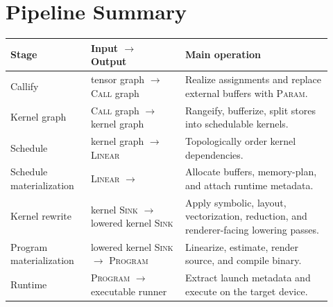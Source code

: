 \documentclass[10pt,letterpaper]{article}
\newcommand{\op}[1]{\textsc{#1}}
\newcommand{\code}[1]{\texttt{\detokenize{#1}}}
\begin{document}
\section*{Pipeline Summary}

\begin{tabular}{@{}p{0.23\linewidth} p{0.27\linewidth} p{0.42\linewidth}@{}}
\toprule
\textbf{Stage} & \textbf{Input $\rightarrow$ Output} & \textbf{Main operation} \\
\midrule
Callify & tensor graph $\rightarrow$ \op{Call} graph & Realize assignments and replace external buffers with \op{Param}. \\
Kernel graph & \op{Call} graph $\rightarrow$ kernel graph & Rangeify, bufferize, split stores into schedulable kernels. \\
Schedule & kernel graph $\rightarrow$ \op{Linear} & Topologically order kernel dependencies. \\
Schedule materialization & \op{Linear} $\rightarrow$ \code{list[ExecItem]} & Allocate buffers, memory-plan, and attach runtime metadata. \\
Kernel rewrite & kernel \op{Sink} $\rightarrow$ lowered kernel \op{Sink} & Apply symbolic, layout, vectorization, reduction, and renderer-facing lowering passes. \\
Program materialization & lowered kernel \op{Sink} $\rightarrow$ \op{Program} & Linearize, estimate, render source, and compile binary. \\
Runtime & \op{Program} $\rightarrow$ executable runner & Extract launch metadata and execute on the target device. \\
\bottomrule
\end{tabular}
\end{document}
